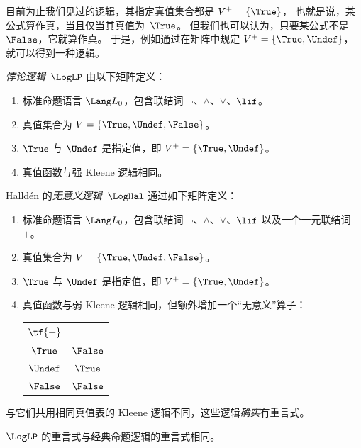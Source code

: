\documentclass[../../../include/open-logic-section]{subfiles}
\begin{document}


目前为止我们见过的逻辑，其指定真值集合都是 $V^+ = \{\True\}$，
也就是说，某公式算作真，当且仅当其真值为~$\True$。
但我们也可以认为，只要某公式不是~$\False$，它就算作真。
于是，例如通过在矩阵中规定 $V^+ = \{\True, \Undef\}$，就可以得到一种逻辑。

\begin{defn}
\emph{悖论逻辑}~$\LogLP$ 由以下矩阵定义：
\begin{enumerate}
  \item 标准命题语言 $\Lang L_0$，包含联结词
  $\lnot$、$\land$、$\lor$、$\lif$。
  \item 真值集合为 $V = \{\True, \Undef, \False\}$。
  \item $\True$ 与 $\Undef$ 是指定值，即 $V^+ = \{\True, \Undef\}$。
  \item 真值函数与强 Kleene 逻辑相同。
\end{enumerate}
\end{defn}

\begin{defn}
Halldén 的\emph{无意义逻辑}~$\LogHal$ 通过如下矩阵定义：
\begin{enumerate}
  \item 标准命题语言 $\Lang L_0$，包含联结词
  $\lnot$、$\land$、$\lor$、$\lif$ 以及一个一元联结词~$+$。
  \item 真值集合为 $V = \{\True, \Undef, \False\}$。
  \item $\True$ 与 $\Undef$ 是指定值，即 $V^+ = \{\True, \Undef\}$。
  \item 真值函数与弱 Kleene 逻辑相同，但额外增加一个“无意义”算子：
  \begin{center}
    \begin{tabular}{c|c}
    $\tf{+}$ & \\
    \hline
    $\True$ & $\False$ \\
    $\Undef$ & $\True$ \\
    $\False$ & $\False$
    \end{tabular}
  \end{center}
\end{enumerate}
\end{defn}

与它们共用相同真值表的 Kleene 逻辑不同，这些逻辑\emph{确实}有重言式。

\begin{prop}
 $\LogLP$ 的重言式与经典命题逻辑的重言式相同。
\end{prop}
\end{document}
